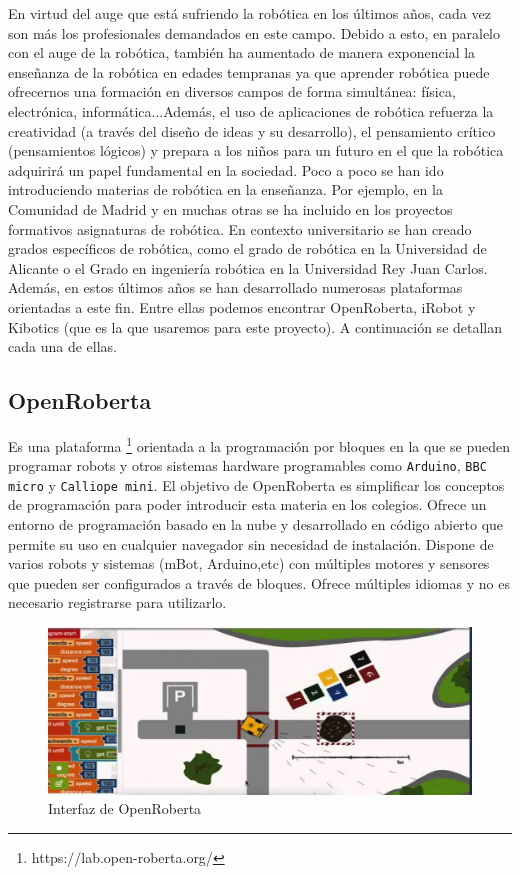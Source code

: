 \documentclass{report}
\begin{document}
En virtud del auge que está sufriendo la robótica en los últimos años, cada vez son más los profesionales demandados en este campo. Debido a esto, en paralelo con el auge de la robótica, también ha aumentado de manera exponencial la enseñanza de la robótica en edades tempranas ya que aprender robótica puede ofrecernos una formación en diversos campos de forma simultánea: física, electrónica, informática...Además, el uso de aplicaciones de robótica refuerza la creatividad (a través del diseño de ideas y su desarrollo), el pensamiento crítico (pensamientos lógicos) y prepara a los niños para un futuro en el que la robótica adquirirá un papel fundamental en la sociedad. Poco a poco se han ido introduciendo materias de robótica en la enseñanza. Por ejemplo, en la Comunidad de Madrid y en muchas otras se ha incluido en los proyectos formativos asignaturas de robótica. En contexto universitario se han creado grados específicos de robótica, como el grado de robótica en la Universidad de Alicante o el Grado en ingeniería robótica en la Universidad  Rey Juan Carlos. Además, en estos últimos años se han desarrollado numerosas plataformas orientadas a este fin. Entre ellas podemos encontrar OpenRoberta, iRobot y Kibotics (que es la que usaremos para este proyecto). A continuación se detallan cada una de ellas.

\subsection{OpenRoberta}

Es una plataforma \footnote{https://lab.open-roberta.org/} \cite{Open Roberta} orientada a la programación por bloques en la que se pueden programar robots y otros sistemas hardware programables como \texttt{Arduino}, \texttt{BBC micro} y \texttt{Calliope mini}. El objetivo de OpenRoberta es simplificar los conceptos de programación para poder introducir esta materia en los colegios. Ofrece un entorno de programación basado en la nube y desarrollado en código abierto que permite su uso en cualquier navegador sin necesidad de instalación. Dispone de varios robots y sistemas (mBot, Arduino,etc) con múltiples motores y sensores que pueden ser configurados a través de bloques. Ofrece múltiples idiomas y no es necesario registrarse para utilizarlo.

\renewcommand{\figurename}{Figura}		
\begin{figure}[h]
	\centering
	 \includegraphics[scale=0.34]{images/openRoberta.jpg}
	 \caption{Interfaz de OpenRoberta}
\end{figure}
\end{document}
